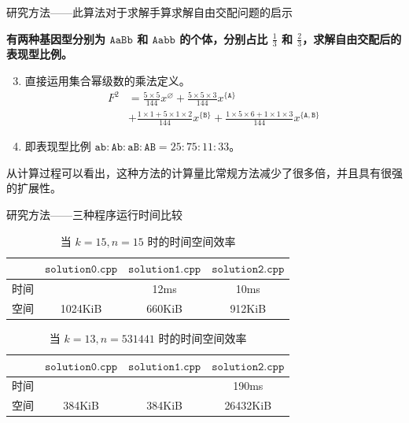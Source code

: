 \documentclass{beamer}
\begin{document}
	\begin{frame}{研究方法——此算法对于求解手算求解自由交配问题的启示}
		
		\textbf{有两种基因型分别为 $\texttt{AaBb}$ 和 $\texttt{Aabb}$ 的个体，分别占比 $\frac{1}{3}$ 和 $\frac{2}{3}$，求解自由交配后的表现型比例。}
		
		\begin{enumerate}\setcounter{enumi}{2}
			\item 直接运用集合幂级数的乘法定义。\\
			$$
			\begin{aligned}
				F^2 &= \frac{5 \times 5}{144} x^{\varnothing} + \frac{5 \times 5 \times 3}{144} x^{\{\texttt{A}\}} \\ &+ \frac{1 \times 1 + 5 \times 1 \times 2}{144} x^{\{\texttt{B}\}} + \frac{1 \times 5 \times 6 + 1 \times 1 \times 3}{144} x^{\{\texttt{A},\texttt{B}\}}
			\end{aligned}
			$$
			\item 即表现型比例 $\texttt{ab} : \texttt{Ab} : \texttt{aB} : \texttt{AB}=25:75:11:33$。
		\end{enumerate}
	
		从计算过程可以看出，这种方法的计算量比常规方法减少了很多倍，并且具有很强的扩展性。
	\end{frame}

	\begin{frame}{研究方法——三种程序运行时间比较}
		\begin{table}[htbp]
			\centering
			\caption{当 $k=15,n=15$ 时的时间空间效率}
			\begin{tabular}{c|c|c|c}
				& $\texttt{solution0.cpp}$ & $\texttt{solution1.cpp}$ & $\texttt{solution2.cpp}$ \\ \hline
				时间 & \color{red}{>1000ms} & 12ms & 10ms \\ \hline
				空间 & 1024KiB & 660KiB & 912KiB
			\end{tabular}
		\end{table}
		
		\begin{table}[htbp]
			\centering
			\caption{当 $k=13,n=531441$ 时的时间空间效率}
			\begin{tabular}{c|c|c|c}
				& $\texttt{solution0.cpp}$ & $\texttt{solution1.cpp}$ & $\texttt{solution2.cpp}$ \\ \hline
				时间 & \color{red}{>1000ms} & \color{red}{>1000ms} & 190ms \\ \hline
				空间 & 384KiB & 384KiB & 26432KiB
			\end{tabular}
		\end{table}
	\end{frame}
\end{document}
